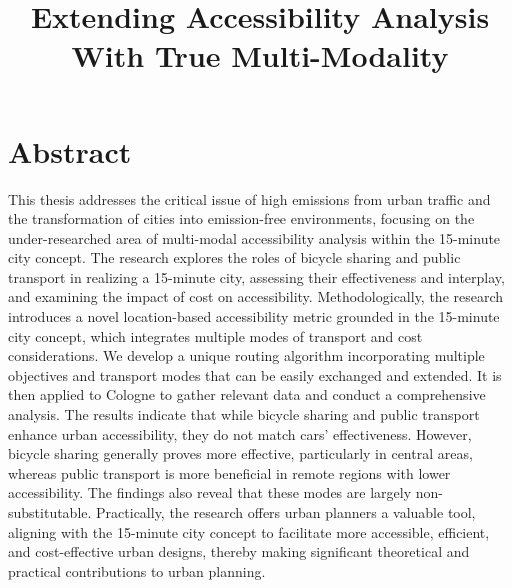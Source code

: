 \documentclass[a4paper, twoside, 12pt]{article}
\title{Extending Accessibility Analysis With True Multi-Modality}
\begin{document}




\clearpage
\thispagestyle{empty}
\section*{Abstract}

This thesis addresses the critical issue of high emissions from urban traffic and the transformation of cities into emission-free environments, focusing on the under-researched area of multi-modal accessibility analysis within the 15-minute city concept. 
The research explores the roles of bicycle sharing and public transport in realizing a 15-minute city, assessing their effectiveness and interplay, and examining the impact of cost on accessibility.
Methodologically, the research introduces a novel location-based accessibility metric grounded in the 15-minute city concept, which integrates multiple modes of transport and cost considerations.
We develop a unique routing algorithm incorporating multiple objectives and transport modes that can be easily exchanged and extended.
It is then applied to Cologne to gather relevant data and conduct a comprehensive analysis.
The results indicate that while bicycle sharing and public transport enhance urban accessibility, they do not match cars' effectiveness.
However, bicycle sharing generally proves more effective, particularly in central areas, whereas public transport is more beneficial in remote regions with lower accessibility.
The findings also reveal that these modes are largely non-substitutable. 
Practically, the research offers urban planners a valuable tool, aligning with the 15-minute city concept to facilitate more accessible, efficient, and cost-effective urban designs, thereby making significant theoretical and practical contributions to urban planning.


\clearpage
{}
\tableofcontents
\clearpage
\listoffigures
\clearpage
\listoftables
\clearpage
\end{document}
